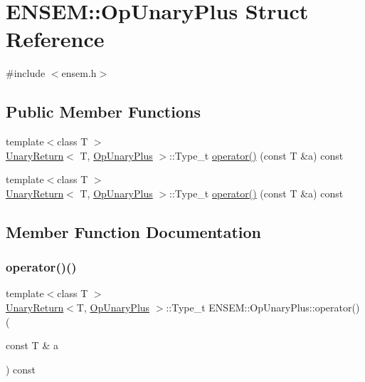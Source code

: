 \hypertarget{structENSEM_1_1OpUnaryPlus}{}\section{E\+N\+S\+EM\+:\+:Op\+Unary\+Plus Struct Reference}
\label{structENSEM_1_1OpUnaryPlus}


{\ttfamily \#include $<$ensem.\+h$>$}

\subsection*{Public Member Functions}
\begin{DoxyCompactItemize}
\item 
{\footnotesize template$<$class T $>$ }\\\mbox{\hyperlink{structENSEM_1_1UnaryReturn}{Unary\+Return}}$<$ T, \mbox{\hyperlink{structENSEM_1_1OpUnaryPlus}{Op\+Unary\+Plus}} $>$\+::Type\+\_\+t \mbox{\hyperlink{structENSEM_1_1OpUnaryPlus_a508ecfc90631234c54b97cb705b14bc5}{operator()}} (const T \&a) const
\item 
{\footnotesize template$<$class T $>$ }\\\mbox{\hyperlink{structENSEM_1_1UnaryReturn}{Unary\+Return}}$<$ T, \mbox{\hyperlink{structENSEM_1_1OpUnaryPlus}{Op\+Unary\+Plus}} $>$\+::Type\+\_\+t \mbox{\hyperlink{structENSEM_1_1OpUnaryPlus_a508ecfc90631234c54b97cb705b14bc5}{operator()}} (const T \&a) const
\end{DoxyCompactItemize}


\subsection{Member Function Documentation}
\mbox{\label{structENSEM_1_1OpUnaryPlus_a508ecfc90631234c54b97cb705b14bc5}} 
\subsubsection{\texorpdfstring{operator()()}{operator()()}\hspace{0.1cm}{\footnotesize\ttfamily [1/2]}}
{\footnotesize\ttfamily template$<$class T $>$ \\
\mbox{\hyperlink{structENSEM_1_1UnaryReturn}{Unary\+Return}}$<$T, \mbox{\hyperlink{structENSEM_1_1OpUnaryPlus}{Op\+Unary\+Plus}} $>$\+::Type\+\_\+t E\+N\+S\+E\+M\+::\+Op\+Unary\+Plus\+::operator() (\begin{DoxyParamCaption}\item[{const T \&}]{a }\end{DoxyParamCaption}) const\hspace{0.3cm}{\ttfamily [inline]}}

